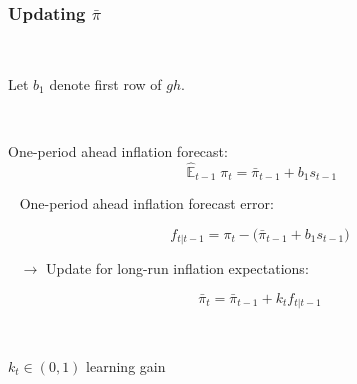 \documentclass[10pt]{beamer}
\DeclareMathOperator{\E}{\mathbb{E}}
\begin{document}
\begin{frame}
	\frametitle{Updating $\bar{\pi}$}
	\label{RLS_special}

\

 Let $b_1$ denote first row of $g h$.
 
 \
 
 One-period ahead inflation forecast:
 \begin{equation}
 \hat{\E}_{t-1}\pi_{t} = \bar{\pi}_{t-1}+b_1 s_{t-1}
 \end{equation}

\
\pause
One-period ahead inflation forecast error:

 \begin{equation}
f_{t|t-1}  = \pi_{t} - \big(\bar{\pi}_{t-1}+b_1 s_{t-1}\big)
 \end{equation}

\
\pause
$\rightarrow$ Update for long-run inflation expectations:	

\begin{equation}
\bar{\pi}_{t}  =\bar{\pi}_{t-1} +k_t  f_{t|t-1} 
\end{equation}
 
 \
 
 $k_t \in (0,1)$ learning gain \\
\vfill 

\hfill \hyperlink{RLS}{}




\end{frame}
\end{document}

